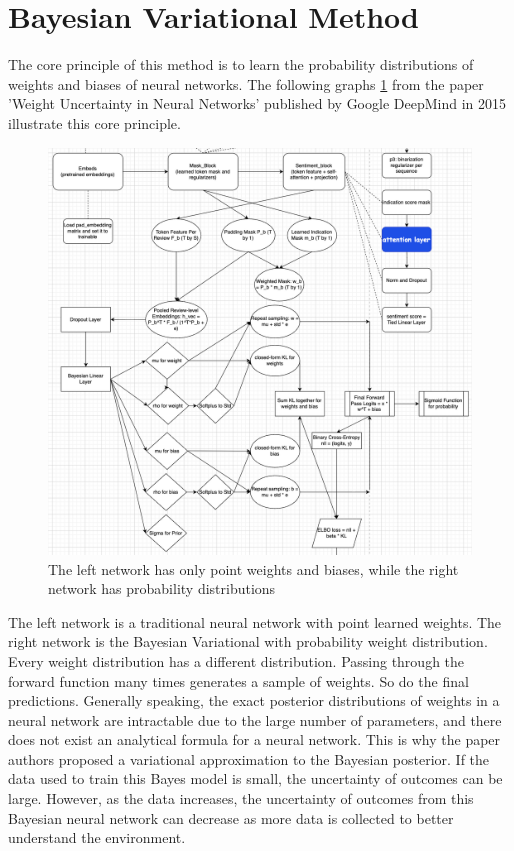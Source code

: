 \documentclass{article}
\begin{document}
\section{Bayesian Variational Method}
The core principle of this method is to learn the probability distributions of weights and biases of neural networks. The following graphs \ref{fig:bayes} from the paper 'Weight Uncertainty in Neural Networks' published by Google DeepMind in 2015 \textcite{blundell2015weightuncertaintyneuralnetworks} illustrate this core principle.
\begin{figure}[!ht]
    \centering
    \includegraphics[width=0.5\linewidth]{bayes.png}
    \caption{The left network has only point weights and biases, while the right network has probability distributions}
    \label{fig:bayes}
\end{figure}
The left network is a traditional neural network with point learned weights. The right network is the Bayesian Variational with probability weight distribution. Every weight distribution has a different distribution. Passing through the forward function many times generates a sample of weights. So do the final predictions. Generally speaking, the exact posterior distributions of weights in a neural network are intractable due to the large number of parameters, and there does not exist an analytical formula for a neural network. This is why the paper authors proposed a variational approximation to the Bayesian posterior. If the data used to train this Bayes model is small, the uncertainty of outcomes can be large. However, as the data increases, the uncertainty of outcomes from this Bayesian neural network can decrease as more data is collected to better understand the environment.    
\end{document}
